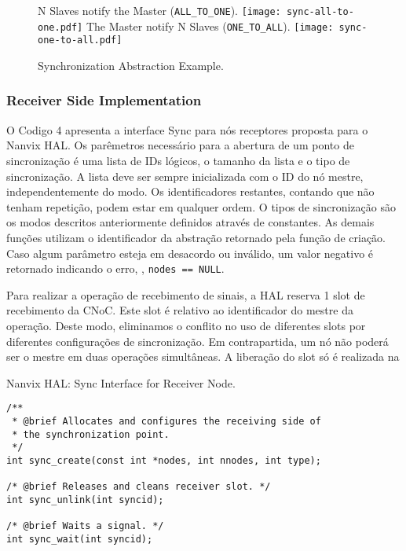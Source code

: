 			\begin{figure}[!tb]
				\centering%
				\caption{Synchronization Abstraction Example.}%
				\label{fig:sync-concepts}%

					{N Slaves notify the Master (\texttt{ALL\_TO\_ONE}).}%
					{\texttt{[image: sync-all-to-one.pdf]}}%
				\hfill
					{The Master notify N Slaves (\texttt{ONE\_TO\_ALL}).}%
					{\texttt{[image: sync-one-to-all.pdf]}}%

			\end{figure}

			\subsubsection{Receiver Side Implementation}

				O Codigo 4 apresenta a interface Sync para nós receptores proposta para o Nanvix HAL.
				Os parêmetros necessário para a abertura de um ponto de sincronização é uma lista de IDs lógicos, o tamanho da lista e o tipo de sincronização.
				A lista deve ser sempre inicializada com o ID do nó mestre, independentemente do modo.
				Os identificadores restantes, contando que não tenham repetição, podem estar em qualquer ordem.
				O tipos de sincronização são os modos descritos anteriormente definidos através de constantes.
				As demais funções utilizam o identificador da abstração retornado pela função de criação.
				Caso algum parâmetro esteja em desacordo ou inválido, um valor negativo é retornado indicando o erro, \eg, \texttt{nodes == NULL}.

				Para realizar a operação de recebimento de sinais, a HAL reserva 1 slot de recebimento da CNoC.
				Este slot é relativo ao identificador do mestre da operação.
				Deste modo, eliminamos o conflito no uso de diferentes slots por diferentes configurações de sincronização.
				Em contrapartida, um nó não poderá ser o mestre em duas operações simultâneas.
				A liberação do slot só é realizada na 




\begin{listing}[!tb]
\caption{Nanvix HAL: Sync Interface for Receiver Node.}
\label{code:hal-sync-receiver}
\begin{verbatim}
/**
 * @brief Allocates and configures the receiving side of
 * the synchronization point.
 */
int sync_create(const int *nodes, int nnodes, int type);

/* @brief Releases and cleans receiver slot. */
int sync_unlink(int syncid);

/* @brief Waits a signal. */
int sync_wait(int syncid);
\end{verbatim}
\end{listing}

